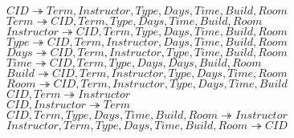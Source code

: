 $CID \twoheadrightarrow Term, Instructor, Type, Days, Time, Build, Room$\\
$Term \twoheadrightarrow CID, Term, Type, Days, Time, Build, Room$\\
$Instructor \twoheadrightarrow CID,Term,Type,Days,Time,Build,Room$\\
$Type \twoheadrightarrow CID,Term,Instructor,Days,Time,Build,Room$\\
$Days \twoheadrightarrow CID, Term, Instructor, Type, Time, Build, Room$
$Time \twoheadrightarrow CID,Term,Type,Days,Days,Build,Room$\\
$Build \twoheadrightarrow CID,Term,Instructor,Type,Days,Time,Room$\\
$Room \twoheadrightarrow CID,Term,Instructor,Type,Days,Time, Build$\\
$CID,Term \twoheadrightarrow Instructor$\\
$CID, Instructor \twoheadrightarrow Term$\\
$CID,Term,Type,Days,Time,Build,Room \twoheadrightarrow Instructor$\\
$Instructor,Term,Type,Days,Time,Build,Room \twoheadrightarrow CID$\\

